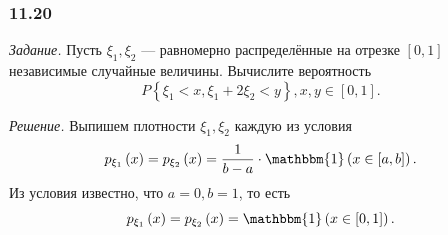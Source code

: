\subsubsection*{11.20}

\textit{Задание.} Пусть $ \xi_1, \xi_2$ --- равномерно распределённые на отрезке $ \left[ 0, 1 \right] $ независимые случайные величины.
Вычислите вероятность
$$P \left\{ \xi_1 < x, \xi_1 + 2 \xi_2 < y \right\},
x, y \in \left[ 0, 1 \right].$$

\textit{Решение.} Выпишем плотности $ \xi_1, \xi_2$ каждую из условия
$$p_{ \xi_1} \left( x \right) =
p_{ \xi_2} \left( x \right) =
\frac{1}{b-a} \cdot \mathbbm{1} \left( x \in \left[ a, b \right] \right).$$
Из условия известно, что $a = 0, b = 1$, то есть
$$p_{ \xi_1} \left( x \right) =
p_{ \xi_2} \left( x \right) =
\mathbbm{1} \left( x \in \left[ 0, 1 \right] \right).$$


